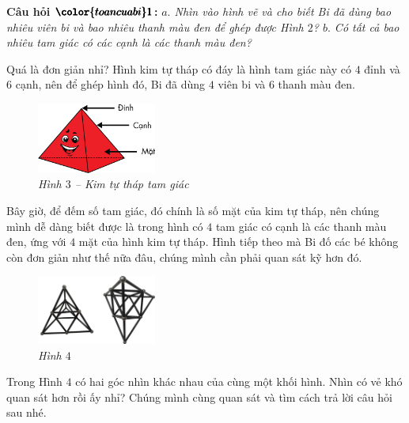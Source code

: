 	\textbf{\color{toancuabi}Câu hỏi $\pmb{\color{toancuabi}1}$:} \textit{$a.$ Nhìn vào hình vẽ và cho biết Bi đã dùng bao nhiêu viên bi và bao nhiêu thanh màu đen để ghép được Hình $2$?
	\vskip 0.1cm
	$b.$ Có tất cả bao nhiêu tam giác có các cạnh là các thanh màu đen? }
	\begin{multicols}{2}
		Quá là đơn giản nhỉ? Hình kim tự tháp có đáy là hình tam giác này có $4$ đỉnh và $6$ cạnh, nên để ghép hình đó, Bi đã dùng $4$ viên bi và $6$ thanh màu đen.
		\begin{figure}[H]
			\centering
			\vspace*{5pt}
			\captionsetup{labelformat= empty, justification=centering}
			\includegraphics[width=0.35\textwidth]{3}
			\caption{\small\textit{Hình $3$ -- Kim tự tháp tam giác}}
			\vspace*{-5pt}
		\end{figure}
	\end{multicols}	
	Bây giờ, để đếm số tam giác, đó chính là số mặt của kim tự tháp, nên chúng mình dễ dàng biết được là trong hình có $4$ tam giác có cạnh là các thanh màu đen, ứng với $4$ mặt của hình kim tự tháp.
	\vskip 0.1cm
	Hình tiếp theo mà Bi đố các bé không còn đơn giản như thế nữa đâu, chúng mình cần phải quan sát kỹ hơn đó.
	\vspace*{-5pt}
	\begin{multicols}{2}
		\begin{figure}[H]
			\centering
			\vspace*{5pt}
			\captionsetup{labelformat= empty, justification=centering} \includegraphics[width=0.35\textwidth]{4}
			\caption{\small\textit{Hình $4$}}
			\vspace*{-5pt}
		\end{figure}
		Trong Hình $4$ có hai góc nhìn khác nhau của cùng một khối hình. Nhìn có vẻ khó quan sát hơn rồi ấy nhỉ? Chúng mình cùng quan sát và tìm cách trả lời câu hỏi sau nhé.
	\end{multicols}
